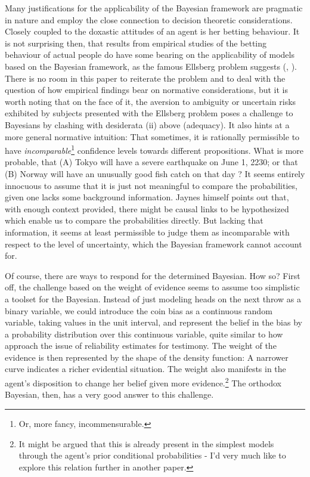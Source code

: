\documentclass[11pt, a4paper]{scrartcl}
\begin{document}
Many justifications for the applicability of the Bayesian framework are pragmatic in nature and employ the close connection to decision theoretic considerations. Closely coupled to the doxastic attitudes of an agent is her betting behaviour. It is not surprising then, that results from empirical studies of the betting behaviour of actual people do have some bearing on the applicability of models based on the Bayesian framework, as the famous Ellsberg problem suggests (\citet{Ellsberg}, \citet{Camerer1992}). There is no room in this paper to reiterate the problem and to deal with the question of how empirical findings bear on normative considerations, but it is worth noting that on the face of it, the aversion to ambiguity or uncertain risks exhibited by subjects presented with the Ellsberg problem poses a challenge to Bayesians by clashing with desiderata (ii) above (adequacy). It also hints at a more general normative intuition: That sometimes, it is rationally permissible to have \emph{incomparable}\footnote{Or, more fancy, incommensurable.} confidence levels towards different propositions. What is more probable, that (A) Tokyo will have a severe earthquake on June 1, 2230; or that (B) Norway will have an unusually good fish catch on that day \citep[p.658]{Jaynes2003-JAYPTT}? It seems entirely innocuous to assume that it is just not meaningful to compare the probabilities, given one lacks some background information. Jaynes himself points out that, with enough context provided, there might be causal links to be hypothesized which enable us to compare the probabilities directly. But lacking that information, it seems at least permissible to judge them as incomparable with respect to the level of uncertainty, which the Bayesian framework cannot account for. 

Of course, there are ways to respond for the determined Bayesian. How so? First off, the challenge based on the weight of evidence seems to assume too simplistic a toolset for the Bayesian. Instead of just modeling heads on the next throw as a binary variable, we could introduce the coin bias as a continuous random variable, taking values in the unit interval, and represent the belief in the bias by a probability distribution over this continuous variable, quite similar to how \citet{Olsson2013} approach the issue of reliability estimates for testimony. The weight of the evidence is then represented by the shape of the density function: A narrower curve indicates a richer evidential situation. The weight also manifests in the agent's disposition to change her belief given more evidence.\footnote{It might be argued that this is already present in the simplest models through the agent's prior conditional probabilities - I'd very much like to explore this relation further in another paper.} The orthodox Bayesian, then, has a very good answer to this challenge. 
\end{document}

